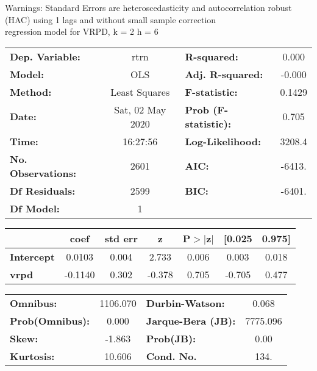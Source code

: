 Warnings: \newline
 [1] Standard Errors are heteroscedasticity and autocorrelation robust (HAC) using 1 lags and without small sample correction\\ 

regression model for VRPD, k = 2 h = 6\begin{center}
\begin{tabular}{lclc}
\toprule
\textbf{Dep. Variable:}    &       rtrn       & \textbf{  R-squared:         } &     0.000   \\
\textbf{Model:}            &       OLS        & \textbf{  Adj. R-squared:    } &    -0.000   \\
\textbf{Method:}           &  Least Squares   & \textbf{  F-statistic:       } &    0.1429   \\
\textbf{Date:}             & Sat, 02 May 2020 & \textbf{  Prob (F-statistic):} &    0.705    \\
\textbf{Time:}             &     16:27:56     & \textbf{  Log-Likelihood:    } &    3208.4   \\
\textbf{No. Observations:} &        2601      & \textbf{  AIC:               } &    -6413.   \\
\textbf{Df Residuals:}     &        2599      & \textbf{  BIC:               } &    -6401.   \\
\textbf{Df Model:}         &           1      & \textbf{                     } &             \\
\bottomrule
\end{tabular}
\begin{tabular}{lcccccc}
                   & \textbf{coef} & \textbf{std err} & \textbf{z} & \textbf{P$> |$z$|$} & \textbf{[0.025} & \textbf{0.975]}  \\
\midrule
\textbf{Intercept} &       0.0103  &        0.004     &     2.733  &         0.006        &        0.003    &        0.018     \\
\textbf{vrpd}      &      -0.1140  &        0.302     &    -0.378  &         0.705        &       -0.705    &        0.477     \\
\bottomrule
\end{tabular}
\begin{tabular}{lclc}
\textbf{Omnibus:}       & 1106.070 & \textbf{  Durbin-Watson:     } &    0.068  \\
\textbf{Prob(Omnibus):} &   0.000  & \textbf{  Jarque-Bera (JB):  } & 7775.096  \\
\textbf{Skew:}          &  -1.863  & \textbf{  Prob(JB):          } &     0.00  \\
\textbf{Kurtosis:}      &  10.606  & \textbf{  Cond. No.          } &     134.  \\
\bottomrule
\end{tabular}
\end{center}

